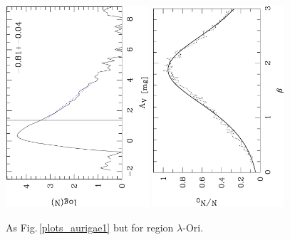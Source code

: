 \documentclass[useAMS,usenatbib]{mn2e}
\begin{document}
\begin{appendix}
\begin{figure}
\includegraphics[height=7.5cm,angle=-90]{av_dist_lori.ps}
\hfill
\includegraphics[height=7.5cm,angle=-90]{histo_lori.ps}
\caption{\label{plots_lori} As Fig.\,\ref{plots_aurigae1} but for region
$\lambda$-Ori.} 
 
\end{figure}


\end{appendix}
\end{document}
